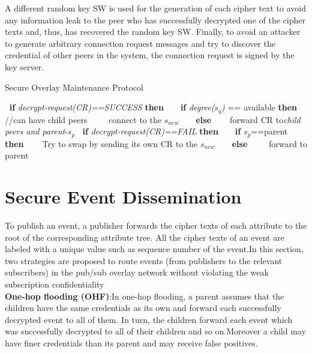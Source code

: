 \documentclass[MTech]{iitmdiss}
\begin{document}
A different random key SW is used for the generation of
each cipher text to avoid any information leak to the peer
who has successfully decrypted one of the cipher texts and,
thus, has recovered the random key SW. Finally, to avoid
an attacker to generate arbitrary connection request
messages and try to discover the credential of other peers
in the system, the connection request is signed by the key
server.\\
\begin{algorithm}
  \caption{Secure Overlay Maintenance Protocol}
  \label{alg3}
  \begin{algorithmic}[1]
   \State  $~$ \hspace{0.25cm} \textbf{if}  \textit{decrypt-request(CR)==SUCCESS } \textbf{then}
  \State $~$ $~$ $~$\hspace{0.45cm} \textbf{if}  \textit{degree($s_q$)} == available \textbf{then}   //can have child peers
 \State $~$ $~$ $~$ $~$\hspace{0.6cm} connect to the $s_{new}$
 \State $~$ $~$ $~$\hspace{0.45cm} \textbf{else}
 \State $~$ $~$ $~$ $~$\hspace{0.6cm}forward CR to\textit {child peers and parent}-$s_p$
 \State $~$\hspace{0.25cm} \textbf{if}  \textit{decrypt-request(CR)==FAIL} \textbf{then}
\State$~$ $~$ $~$\hspace{0.45cm} \textbf{if} $s_p$==parent \textbf{then}
 \State $~$ $~$ $~$ $~$\hspace{0.6cm}Try to swap by sending its own CR to the $s_{new}$
\State $~$ $~$ $~$\hspace{0.35cm} \textbf{else}
\State $~$ $~$ $~$ $~$\hspace{0.55cm} forward to parent
 
\end{algorithmic}
\end{algorithm}
\section{ Secure Event Dissemination}
To publish an event, a publisher forwards the cipher texts of
each attribute to the root of the corresponding attribute tree.
All the cipher texts of an event are labeled with a unique
value such as sequence number of the event.In this section, two strategies are proposed  to
route events (from publishers to the relevant subscribers) in
the pub/sub overlay network without violating the weak
subscription confidentiality\\
\textbf{One-hop flooding (OHF)}:In one-hop flooding, a parent
assumes that the children have the same credentials as its
own and forward each successfully decrypted event to all of
them. In turn, the children forward each event which was
successfully decrypted to all of their children and so on.Moreover a child may have finer credentials than its parent and
may receive false positives.
\end{document}
